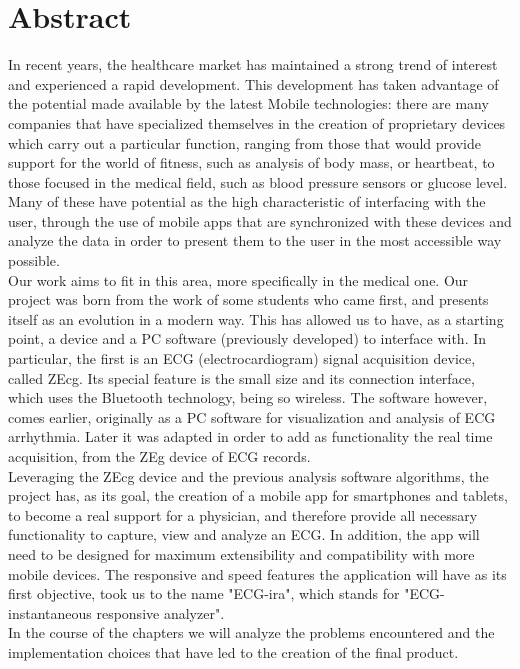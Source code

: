 \chapter{Abstract}

In recent years, the healthcare market has maintained a strong trend of interest and experienced a rapid development. This development has taken advantage of the potential made available by the latest Mobile technologies: there are many companies that have specialized themselves in the creation of proprietary devices which carry out a particular function, ranging from those that would provide support for the world of fitness, such as analysis of body mass, or heartbeat, to those focused in the medical field, such as blood pressure sensors or glucose level. Many of these have potential as the high characteristic of interfacing with the user, through the use of mobile apps that are synchronized with these devices and analyze the data in order to present them to the user in the most accessible way possible.\\
Our work aims to fit in this area, more specifically in the medical one. Our project was born from the work of some students who came first, and presents itself as an evolution in a modern way. This has allowed us to have, as a starting point, a device and a PC software (previously developed) to interface with. In particular, the first is an ECG (electrocardiogram) signal acquisition device, called ZEcg. Its special feature is the small size and its connection interface, which uses the Bluetooth technology, being so wireless.  The software however, comes earlier, originally as a PC software for visualization and analysis of ECG arrhythmia. Later it was adapted in order to add as functionality the  real time acquisition, from the ZEg device of ECG records.\\
Leveraging the ZEcg device and the previous analysis software algorithms, the project has, as its goal, the creation of a mobile app for smartphones and tablets, to become a real support for a physician, and therefore provide all necessary functionality to capture, view and analyze an ECG. In addition, the app will need to be designed for maximum extensibility and compatibility with more mobile devices. The responsive and speed features the application will have as its first objective, took us to the name "ECG-ira", which stands for "ECG-instantaneous responsive analyzer".\\
In the course of the chapters we will analyze the problems encountered and the implementation choices that have led to the creation of the final product.